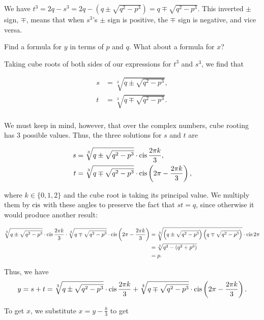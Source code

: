 \documentclass[../key.tex]{subfiles}
\begin{document}
We have $t^3 = 2q - s^3 = 2q - (q \pm \sqrt{q^2 - p^3}) = q \mp \sqrt{q^2-p^3}$. This inverted $\pm$ sign, $\mp$, means that when $s^3$'s $\pm$ sign is positive, the $\mp$ sign is negative, and vice versa.

\begin{inner_problem}
\item Find a formula for $y$ in terms of $p$ and $q$. What about a formula for $x$?
\end{inner_problem}

Taking cube roots of both sides of our expressions for $t^3$ and $s^3$, we find that

\begin{align*}
s&=\sqrt[3]{q \pm \sqrt{q^2 - p^3}}, \\
t&=\sqrt[3]{q \mp \sqrt{q^2 - p^3}}. \\
\end{align*}

We must keep in mind, however, that over the complex numbers, cube rooting has $3$ possible values. Thus, the three solutions for $s$ and $t$ are

\begin{align*}
s&=\sqrt[3]{q \pm \sqrt{q^2 - p^3}}\cdot \operatorname{cis} \frac{2\pi k}{3}, \\
t&=\sqrt[3]{q \mp \sqrt{q^2 - p^3}}\cdot \operatorname{cis} \left(2\pi - \frac{2\pi k}{3}\right), \\
\end{align*}

where $k\in \{0,1,2\}$ and the cube root is taking its principal value. We multiply them by $\operatorname{cis}$ with these angles to preserve the fact that $st = q$, since otherwise it would produce another result:

\begin{align*}
\sqrt[3]{q \pm \sqrt{q^2 - p^3}}\cdot \operatorname{cis} \frac{2\pi k}{3} \cdot \sqrt[3]{q \mp \sqrt{q^2 - p^3}}\cdot \operatorname{cis} \left(2\pi - \frac{2\pi k}{3}\right) &= \sqrt[3]{\left(q \pm \sqrt{q^2 - p^3}\right)\left(q \mp \sqrt{q^2 - p^3}\right)}\cdot \operatorname{cis} 2\pi \\
&= \sqrt[3]{q^2 - (q^2 + p^3)} \\
&= p.
\end{align*}

Thus, we have $$y=s+t=\sqrt[3]{q \pm \sqrt{q^2 - p^3}} \cdot \operatorname{cis} \frac{2\pi k}{3} + \sqrt[3]{q \mp \sqrt{q^2 - p^3}} \cdot \operatorname{cis} \left(2\pi - \frac{2\pi k}{3}\right).$$

To get $x$, we substitute $x=y-\frac{b}{3}$ to get
\end{document}
